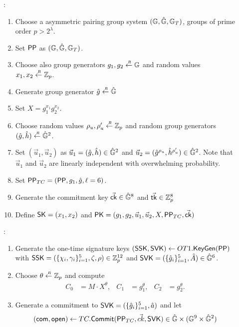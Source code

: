 \begin{description}

\item[]:
  \begin{enumerate}
  \item Choose a asymmetric pairing group system $(\mathbb{G}, \hat{\mathbb{G}}, \mathbb{G}_T)$, groups of prime order $p > 2^\lambda$.
  \item Set $\mathsf{PP}$ as $(\mathbb{G}, \hat{\mathbb{G}}, \mathbb{G}_T)$.
  \item Choose also group generators $g_1, g_2 \stackrel{{\scriptscriptstyle \mkern4mu R}}{\gets} \mathbb{G}$ and random values $x_1, x_2 \stackrel{{\scriptscriptstyle \mkern4mu R}}{\gets} \mathbb{Z}_p$.
  \item Generate group generator $\hat{g} \stackrel{{\scriptscriptstyle \mkern4mu R}}{\gets} \hat{\mathbb{G}}$
  \item Set $X = g_1^{x_1}g_2^{x_2}$.
  \item Choose random values $\rho_u,\rho_u' \stackrel{{\scriptscriptstyle \mkern4mu R}}{\gets} \mathbb{Z}_p$ and random group generators $(\hat{g}, \hat{h}) \stackrel{{\scriptscriptstyle \mkern4mu R}}{\gets} \hat{\mathbb{G}}^2$.
  \item Set $(\vec{u}_1, \vec{u}_2)$ as $\vec{u}_1 = (\hat{g}, \hat{h}) \in \hat{\mathbb{G}}^2$ and $\vec{u}_2 =  (\hat{g}^{\rho_u}, \hat{h}^{\rho_u'}) \in \hat{\mathbb{G}}^2$. Note that $\vec{u}_1$ and $\vec{u}_2$ are linearly independent with overwhelming probability.
  \item Set $\mathsf{PP}_{TC} = (\mathsf{PP}, g_1, \hat{g}, \ell = 6)$.
  \item Generate the commitment key $\vec{\mathsf{ck}} \in \hat{\mathbb{G}}^8$ and $\vec{\mathsf{tk}} \in \mathbb{Z}_p^8$
  \item Define $\mathsf{SK} = (x_1, x_2)$ and $\mathsf{PK} = (g_1, g_2, \vec{u}_1, \vec{u}_2, X, \mathsf{PP}_{TC}, \vec{\mathsf{ck}})$
  \end{enumerate}
\item[]:
  \begin{enumerate}
  \item Generate the one-time signature keys $(\mathsf{SSK}, \mathsf{SVK}) \gets OT1.{\mathsf{KeyGen}}(\mathsf{PP})$ with $\mathsf{SSK} = (\{\chi_i, \gamma_i\}_{i=1}^5, \zeta, \rho) \in \mathbb{Z}_p^{12}$ and $\mathsf{SVK} =  (\{\hat{g}_i\}_{i =1}^5,  \hat{A} ) \in \hat{\mathbb{G}}^6$.
  \item Choose $\theta \stackrel{{\scriptscriptstyle \mkern4mu R}}{\gets} \mathbb{Z}_p$ and compute
    \begin{align*}
      C_0 &= M\cdot X^{\theta}, & C_1 &= g_1^{\theta}, & C_2 &= g_2^{\theta}.
    \end{align*}
  \item Generate a commitment to $\mathsf{SVK} = (\{\hat{g}_i\}_{i =1}^5, \hat{a})$ and let 
    $$(\mathsf{com}, \mathsf{open}) \gets TC.{\mathsf{Commit}}(\mathsf{PP}_{TC}, \vec{ck}, \mathsf{SVK}) \in \hat{\mathbb{G}} \times (\mathbb{G}^9 \times \hat{\mathbb{G}}^2)$$

\end{enumerate}
\end{description}
